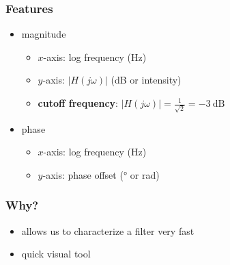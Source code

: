 \documentclass[aspectratio=169]{beamer}
\begin{document}
\begin{frame}
    \frametitle{Features}

    \begin{itemize}
        \item magnitude
        \begin{itemize}
            \item \(x\)-axis: log frequency (\si{\hertz})
            \item \(y\)-axis: \(|H(j \omega)|\) (\si{\deci\bel} or intensity)
            \item \textbf{cutoff frequency}: \(|H(j \omega)| = \frac{1}{\sqrt{2}} = \SI{-3}{\deci\bel}\)
        \end{itemize}
        \item phase
        \begin{itemize}
            \item \(x\)-axis: log frequency (\si{\hertz})
            \item \(y\)-axis: phase offset (\si{\degree} or \si{\radian})
        \end{itemize}
    \end{itemize}
\end{frame}

\begin{frame}
    \frametitle{Why?}

    \begin{itemize}
        \item allows us to characterize a filter very fast
        \item quick visual tool
    \end{itemize}
\end{frame}
\end{document}
